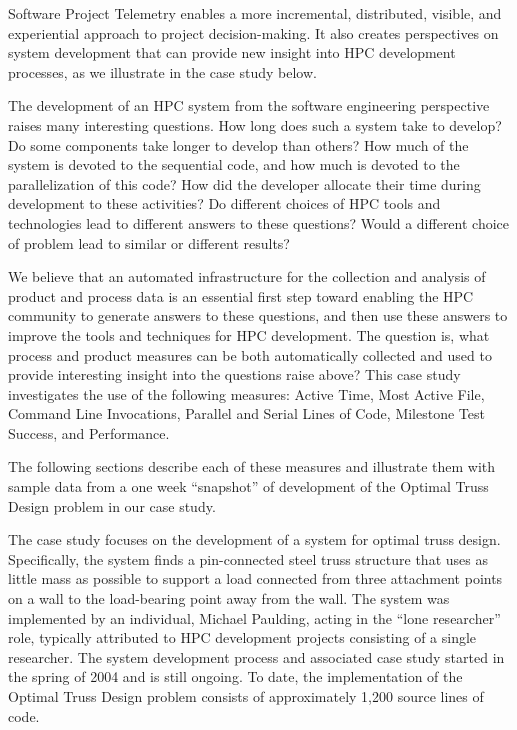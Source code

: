 \documentclass[times,10pt,twocolumn]{article}
\begin{document}
Software Project Telemetry enables a more incremental, distributed,
visible, and experiential approach to project decision-making. It also
creates perspectives on system development that can provide new insight
into HPC development processes, as we illustrate in the case study below.


\label{sec:metrics}

The development of an HPC system from the software engineering perspective
raises many interesting questions.  How long does such a system take to
develop?  Do some components take longer to develop than others?  How much
of the system is devoted to the sequential code, and how much is devoted
to the parallelization of this code?  How did the developer allocate their
time during development to these activities?  Do different choices of HPC
tools and technologies lead to different answers to these questions?  Would 
a different choice of problem lead to similar or different results? 

We believe that an automated infrastructure for the collection and
analysis of product and process data is an essential first step toward
enabling the HPC community to generate answers to these questions,
and then use these answers to improve the tools and techniques for
HPC development.  The question is, what process and product measures
can be both automatically collected and used to provide interesting
insight into the questions raise above?  This case study investigates
the use of the following measures: Active Time, Most Active File,
Command Line Invocations, Parallel and Serial Lines of Code, Milestone
Test Success, and Performance.

The following sections describe each of these measures and illustrate them
with sample data from a one week ``snapshot'' of development of the Optimal
Truss Design problem in our case study. 

\label{sec:truss}

The case study focuses on the development of a system for optimal
truss design.  Specifically, the system finds a pin-connected steel
truss structure that uses as little mass as possible to support a load
connected from three attachment points on a wall to the load-bearing
point away from the wall.  The system was implemented by an individual,
Michael Paulding, acting in the ``lone researcher'' role, typically
attributed to HPC development projects consisting of a single
researcher.  The system development process and associated case study
started in the spring of 2004 and is still ongoing.  To date, the
implementation of the Optimal Truss Design problem consists of
approximately 1,200 source lines of code.
\end{document}
